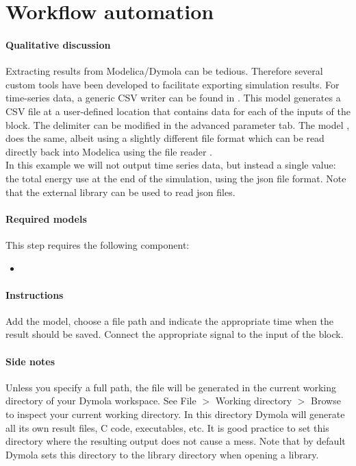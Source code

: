 \documentclass[10pt,a4paper]{article}
\begin{document}
\section{Workflow automation}
\paragraph{Qualitative discussion}
Extracting results from Modelica/Dymola can be tedious. 
Therefore several custom tools have been developed to facilitate exporting simulation results.
For time-series data, a generic CSV writer can be found in .
This model generates a CSV file at a user-defined location that contains
data for each of the inputs of the block. 
The delimiter can be modified in the advanced parameter tab.
The model , does the same, albeit using a slightly
different file format which can be read directly back into Modelica using the
file reader .\\

In this example we will not output time series data, but instead a single value: the total
energy use at the end of the simulation, using the json file format. 
Note that the external library  can be used to read json files.


\paragraph{Required models}
This step requires the following component:
\begin{itemize}
\item {}
\end{itemize}

\paragraph{Instructions}
Add the model, choose a file path and indicate the appropriate time when 
the result should be saved.
Connect the appropriate signal to the input of the block.

\paragraph{Side notes}
Unless you specify a full path, the file will be generated in
the current working directory of your Dymola workspace.
See File $>$ Working directory $>$ Browse to inspect your current
working directory.
In this directory Dymola will generate all its own result files, C code, executables, etc.
It is good practice to set this directory where the resulting output does not cause a mess.
Note that by default Dymola sets this directory to the library directory when opening a library.
\end{document}
